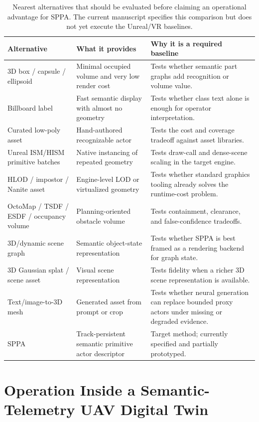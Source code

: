 ﻿\documentclass[11pt,a4paper]{article}
\begin{document}
\begin{table}[h]
\centering
\scriptsize
\setlength{\tabcolsep}{2.5pt}
\caption{Nearest alternatives that should be evaluated before claiming an
operational advantage for SPPA. The current manuscript specifies this comparison
but does not yet execute the Unreal/VR baselines.}
\label{tab:nearest-alternatives}
\begin{tabular}{@{}p{2.7cm}p{4.4cm}p{5.4cm}@{}}
\toprule
Alternative & What it provides & Why it is a required baseline \\
\midrule
3D box / capsule / ellipsoid & Minimal occupied volume and very low render cost
& Tests whether semantic part graphs add recognition or volume value. \\
Billboard label & Fast semantic display with almost no geometry & Tests whether
class text alone is enough for operator interpretation. \\
Curated low-poly asset & Hand-authored recognizable actor & Tests the cost and
coverage tradeoff against asset libraries. \\
Unreal ISM/HISM primitive batches & Native instancing of repeated geometry &
Tests draw-call and dense-scene scaling in the target engine. \\
HLOD / impostor / Nanite asset & Engine-level LOD or virtualized geometry & Tests
whether standard graphics tooling already solves the runtime-cost problem. \\
OctoMap / TSDF / ESDF / occupancy volume & Planning-oriented obstacle volume &
Tests containment, clearance, and false-confidence tradeoffs. \\
3D/dynamic scene graph & Semantic object-state representation & Tests whether
SPPA is best framed as a rendering backend for graph state. \\
3D Gaussian splat / scene asset & Visual scene representation & Tests fidelity
when a richer 3D scene representation is available. \\
Text/image-to-3D mesh & Generated asset from prompt or crop & Tests whether
neural generation can replace bounded proxy actors under missing or degraded
evidence. \\
SPPA & Track-persistent semantic primitive actor descriptor & Target method;
currently specified and partially prototyped. \\
\bottomrule
\end{tabular}
\end{table}

\section{Operation Inside a Semantic-Telemetry UAV Digital Twin}
\end{document}
